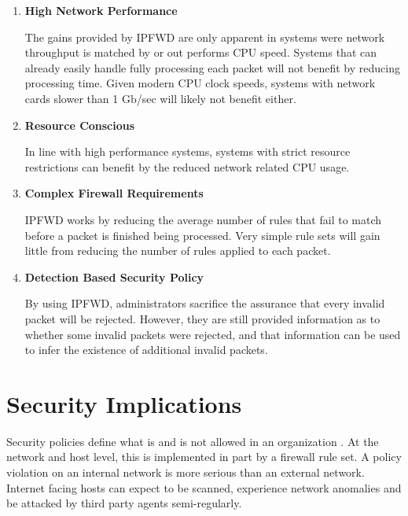\documentclass[journal]{IEEEtran}
\begin{document}
    \begin{enumerate}
      \item \textbf{High Network Performance}

        The gains provided by IPFWD are only apparent in systems were network
        throughput is matched by or out performs CPU speed. Systems that can
        already easily handle fully processing each packet will not benefit by
        reducing processing time. Given modern CPU clock speeds, systems with
        network cards slower than 1 Gb/sec will likely not benefit either.

      \item \textbf{Resource Conscious}

        In line with high performance systems, systems with strict resource
        restrictions can benefit by the reduced network related CPU usage.

      \item \textbf{Complex Firewall Requirements}

        IPFWD works by reducing the average number of rules that fail to match
        before a packet is finished being processed. Very simple rule sets will
        gain little from reducing the number of rules applied to each packet.

      \item \textbf{Detection Based Security Policy}

        By using IPFWD, administrators sacrifice the assurance that every
        invalid packet will be rejected.  However, they are still provided
        information as to whether some invalid packets were rejected, and that
        information can be used to infer the existence of additional invalid
        packets. 

    \end{enumerate}


\section{Security Implications}

  Security policies define what is and is not allowed in an organization . At
  the network and host level, this is implemented in part by a firewall rule
  set. A policy violation on an internal network is more serious than an
  external network. Internet facing hosts can expect to be scanned, experience
  network anomalies and be attacked by third party agents semi-regularly. 
\end{document}
